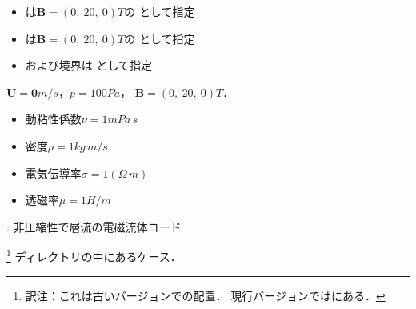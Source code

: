 \begin{description}
\begin{itemize}
{他方をとする．}%
             \item {}は$\bm{B} = (0,\ 20,\ 0) \unit{T}$の
%
%
                   として指定
             \item {}は$\bm{B} = (0,\ 20,\ 0) \unit{T}$の
                   として指定
             \item {}および境界は
%
%
                   として指定
            \end{itemize}
 \item[初期条件] $\bm{U} = \bm{0} \unit{m/s}$，$p = 100 \unit{Pa}$，
            $\bm{B} = (0,\ 20,\ 0) \unit{T}$．
 \item[輸送特性] \mbox{}
            \begin{itemize}
             \item 動粘性係数$\nu = 1 \unit{mPa\,s}$
             \item 密度$\rho = 1 \unit{kg\,m/s}$
             \item 電気伝導率$\sigma = 1 \unit{(\Omega\,m)}$
             \item 透磁率$\mu = 1 \unit{H/m}$
            \end{itemize}
 \item[ソルバ名]
%
%
 : 非圧縮性で層流の電磁流体コード
 \item[ケース名] %
\footnote{訳注：これは古いバージョンでの配置．
現行バージョンではにある．}%
            ディレクトリの中にあるケース．
\end{description}



